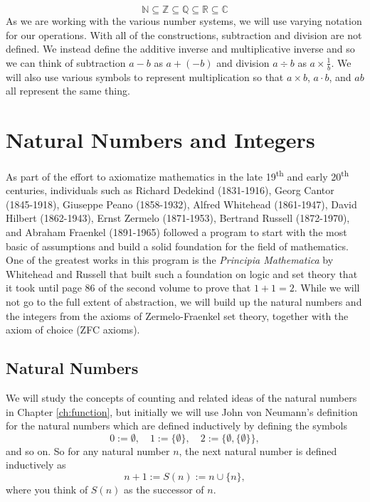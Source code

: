 \documentclass[
]{book}
\theoremstyle{definition}
\theoremstyle{definition}
\theoremstyle{definition}
\theoremstyle{remark}
\begin{document}
\[\mathbb{N} \subseteq \mathbb{Z} \subseteq \mathbb{Q} \subseteq \mathbb{R} \subseteq \mathbb{C}\]
As we are working with the various number systems, we will use varying notation for our operations. With all of the constructions, subtraction and division are not defined. We instead define the additive inverse and multiplicative inverse and so we can think of subtraction \(a-b\) as \(a+(-b)\) and division \(a\div b\) as \(a \times \frac{1}{b}\). We will also use various symbols to represent multiplication so that \(a\times b\), \(a\cdot b\), and \(ab\) all represent the same thing.

\hypertarget{sec:Integers}{%
\section{Natural Numbers and Integers}\label{sec:Integers}}

As part of the effort to axiomatize mathematics in the late 19\textsuperscript{th} and early 20\textsuperscript{th} centuries, individuals such as Richard Dedekind (1831-1916), Georg Cantor (1845-1918), Giuseppe Peano (1858-1932), Alfred Whitehead (1861-1947), David Hilbert (1862-1943), Ernst Zermelo (1871-1953), Bertrand Russell (1872-1970), and Abraham Fraenkel (1891-1965) followed a program to start with the most basic of assumptions and build a solid foundation for the field of mathematics. One of the greatest works in this program is the \emph{Principia Mathematica} by Whitehead and Russell \citetext{\citeyear{Principia1}; \citeyear{Principia2}; \citeyear{Principia3}} that built such a foundation on logic and set theory that it took until page 86 of the second volume to prove that \(1+1=2\). While we will not go to the full extent of abstraction, we will build up the natural numbers and the integers from the axioms of Zermelo-Fraenkel set theory, together with the axiom of choice (ZFC axioms).

\hypertarget{natural-numbers}{%
\subsection{Natural Numbers}\label{natural-numbers}}

We will study the concepts of counting and related ideas of the natural numbers in Chapter \ref{ch:function}, but initially we will use John von Neumann's \citeyearpar{vonNeumann23} definition for the natural numbers which are defined inductively by defining the symbols
\[0:=\emptyset, \quad 1:=\{\emptyset\}, \quad 2:=\{\emptyset, \{\emptyset\}\},\] and so on. So for any natural number \(n\), the next natural number is defined inductively as \[n+1:=S(n) := n\cup \{n\},\] where you think of \(S(n)\) as the successor of \(n\).
\end{document}
